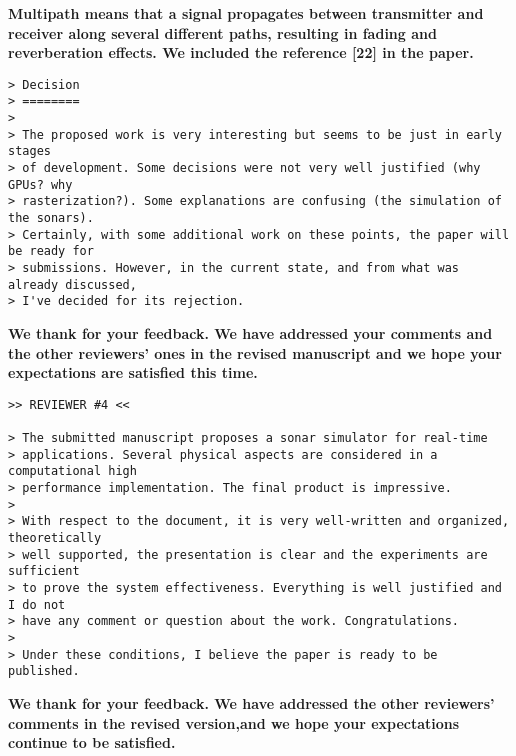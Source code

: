 \documentclass{article}
\begin{document}
\textbf{Multipath means that a signal propagates between transmitter and receiver along
several different paths, resulting in fading and reverberation effects. We included
the reference [22] in the paper.}

\begin{verbatim}
> Decision
> ========
>
> The proposed work is very interesting but seems to be just in early stages
> of development. Some decisions were not very well justified (why GPUs? why
> rasterization?). Some explanations are confusing (the simulation of the sonars).
> Certainly, with some additional work on these points, the paper will be ready for
> submissions. However, in the current state, and from what was already discussed,
> I've decided for its rejection.
\end{verbatim}

\textbf{We thank for your feedback. We have addressed your comments and the other
reviewers' ones in the revised manuscript and we hope your expectations are
satisfied this time.}

\begin{verbatim}
>> REVIEWER #4 <<

> The submitted manuscript proposes a sonar simulator for real-time
> applications. Several physical aspects are considered in a computational high
> performance implementation. The final product is impressive.
>
> With respect to the document, it is very well-written and organized, theoretically
> well supported, the presentation is clear and the experiments are sufficient
> to prove the system effectiveness. Everything is well justified and I do not
> have any comment or question about the work. Congratulations.
>
> Under these conditions, I believe the paper is ready to be published.
\end{verbatim}

\textbf{We thank for your feedback. We have addressed the other reviewers' comments in the revised
version,and we hope your expectations continue to be satisfied.}
\end{document}
